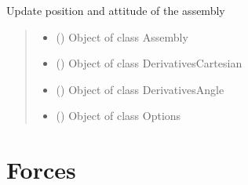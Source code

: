 \documentclass[letterpaper,10pt,english]{sphinxmanual}
\begin{document}
\begin{fulllineitems}
\label{\detokenize{modules:euler.update_position_cartesian}}
\pysigstartsignatures
{}
\pysigstopsignatures
\sphinxAtStartPar
Update position and attitude of the assembly
\begin{quote}\begin{description}
\begin{itemize}
\item {} 
\sphinxAtStartPar
{} ({\hyperref[\detokenize{modules:assembly.Assembly}]{}}) \textendash{} Object of class Assembly

\item {} 
\sphinxAtStartPar
{} ({\hyperref[\detokenize{modules:dynamics.DerivativesCartesian}]{}}) \textendash{} Object of class DerivativesCartesian

\item {} 
\sphinxAtStartPar
{} ({\hyperref[\detokenize{modules:dynamics.DerivativesAngle}]{}}) \textendash{} Object of class DerivativesAngle

\item {} 
\sphinxAtStartPar
{} ({\hyperref[\detokenize{modules:configuration.Options}]{}}) \textendash{} Object of class Options

\end{itemize}

\end{description}\end{quote}

\end{fulllineitems}



\section{Forces}
\label{\detokenize{modules:forces}}
\end{document}
